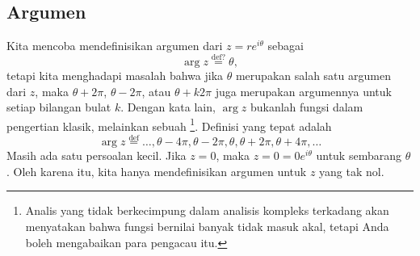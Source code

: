 
\subsection{Argumen}

Kita mencoba mendefinisikan argumen dari $z = re^{i\theta}$ sebagai
%
\begin{equation*}
\arg z
\overset{\text{def?}}{=}
\theta ,
\end{equation*}
tetapi kita menghadapi masalah bahwa jika $\theta$ merupakan salah satu argumen dari $z$,
maka $\theta+2\pi$, $\theta-2\pi$, atau $\theta + k 2\pi$ juga merupakan argumennya
untuk setiap bilangan bulat $k$. Dengan kata lain,
$\arg z$ bukanlah fungsi dalam pengertian klasik, melainkan sebuah
\emph{}%
\footnote{Analis yang tidak berkecimpung dalam analisis kompleks terkadang akan menyatakan bahwa
fungsi bernilai banyak tidak masuk akal, tetapi Anda boleh mengabaikan para pengacau itu.}. Definisi
yang tepat adalah
%
\begin{equation*}
\arg z
\overset{\text{def}}{=}
\ldots,\theta - 4\pi,
\theta - 2\pi,
\theta ,
\theta + 2\pi,
\theta + 4\pi, \ldots
\end{equation*}
Masih ada satu persoalan kecil. Jika $z=0$, maka $z=0=0 e^{i\theta}$ untuk sembarang
$\theta$. Oleh karena itu, kita hanya mendefinisikan argumen untuk $z$ yang tak nol.
